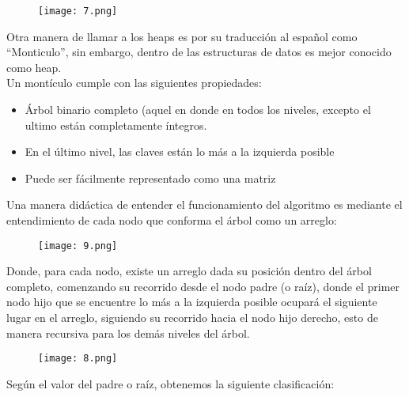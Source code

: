 \documentclass{article}
\begin{document}
\begin{figure}[ht]
\centering
\texttt{[image: 7.png]}
\end{figure}

Otra manera de llamar a los heaps es por su traducción al español como “Monticulo”, sin embargo, dentro de las estructuras de datos es mejor conocido como heap.\\

Un montículo cumple con las siguientes propiedades:
\begin{itemize}
\item Árbol binario completo (aquel en donde en todos los niveles, excepto el ultimo están completamente íntegros.
\item En el último nivel, las claves están lo más a la izquierda posible
\item Puede ser fácilmente representado como una matriz
\end{itemize}

Una manera didáctica de entender el funcionamiento del algoritmo es mediante el entendimiento de cada nodo que conforma el árbol como un arreglo: \\

\begin{figure}[ht]
\centering
\texttt{[image: 9.png]}
\end{figure}

Donde, para cada nodo, existe un arreglo dada su posición dentro del árbol completo, comenzando su recorrido desde el nodo padre (o raíz), donde el primer nodo hijo que se encuentre lo más a la izquierda posible ocupará el siguiente lugar en el arreglo, siguiendo su recorrido hacia el nodo hijo derecho, esto de manera recursiva para los demás niveles del árbol. 

\begin{figure}[ht]
\centering
\texttt{[image: 8.png]}
\end{figure}

Según el valor del padre o raíz, obtenemos la siguiente clasificación:
\end{document}
